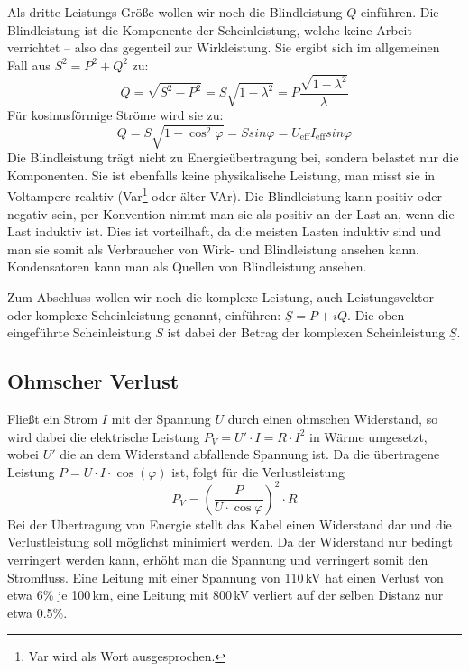 Als dritte Leistungs-Größe wollen wir noch die Blindleistung $Q$ einführen.
Die Blindleistung ist die Komponente der Scheinleistung, welche keine Arbeit verrichtet – also das gegenteil zur Wirkleistung. Sie ergibt sich im allgemeinen Fall aus $S^2=P^2+Q^2$ zu:
\begin{equation}
Q = \sqrt{S^2-P^2} = S \sqrt{1-\lambda^2} = P \frac{\sqrt{1-\lambda^2}}{\lambda}
\end{equation}
Für kosinusförmige Ströme wird sie zu:
\begin{equation}
Q = S \sqrt{1-\cos^2 \varphi} = S sin \varphi = U_{\mathrm{eff}} I_{\mathrm{eff}} sin \varphi
\end{equation}
Die Blindleistung trägt nicht zu Energieübertragung bei, sondern belastet nur die Komponenten. Sie ist ebenfalls keine physikalische Leistung, man misst sie in Voltampere reaktiv (Var\footnote{Var wird als Wort ausgesprochen.} oder älter VAr).
Die Blindleistung kann positiv oder negativ sein, per Konvention nimmt man sie als positiv an der Last an, wenn die Last induktiv ist. Dies ist vorteilhaft, da die meisten Lasten induktiv sind und man sie somit als Verbraucher von Wirk- und Blindleistung ansehen kann. Kondensatoren kann man als Quellen von Blindleistung ansehen.\cite{Harrison}

Zum Abschluss wollen wir noch die komplexe Leistung, auch Leistungsvektor oder komplexe Scheinleistung genannt, einführen: $\underline{S} = P+i Q$. Die oben eingeführte Scheinleistung $S$ ist dabei der Betrag der komplexen Scheinleistung $\underline{S}$.

\subsection{Ohmscher Verlust}
Fließt ein Strom $I$ mit der Spannung $U$ durch einen ohmschen Widerstand, so wird dabei die elektrische Leistung
$P_V = U' \cdot I = R \cdot I^2$
in Wärme umgesetzt, wobei $U'$ die an dem Widerstand abfallende Spannung ist.
Da die übertragene Leistung $P=U \cdot I \cdot \cos(\varphi)$ ist, folgt für die Verlustleistung
\begin{equation}\label{eq:Verlust}
P_V = \left(\frac{P}{U \cdot \cos\varphi}\right)^2\cdot R
\end{equation}
Bei der Übertragung von Energie stellt das Kabel einen Widerstand dar und die Verlustleistung soll möglichst minimiert werden. Da der Widerstand nur bedingt verringert werden kann, erhöht man die Spannung und verringert somit den Stromfluss. Eine Leitung mit einer Spannung von 110\,kV hat einen Verlust von etwa 6\% je 100\,km, eine Leitung mit 800\,kV verliert auf der selben Distanz nur etwa 0.5\%.

